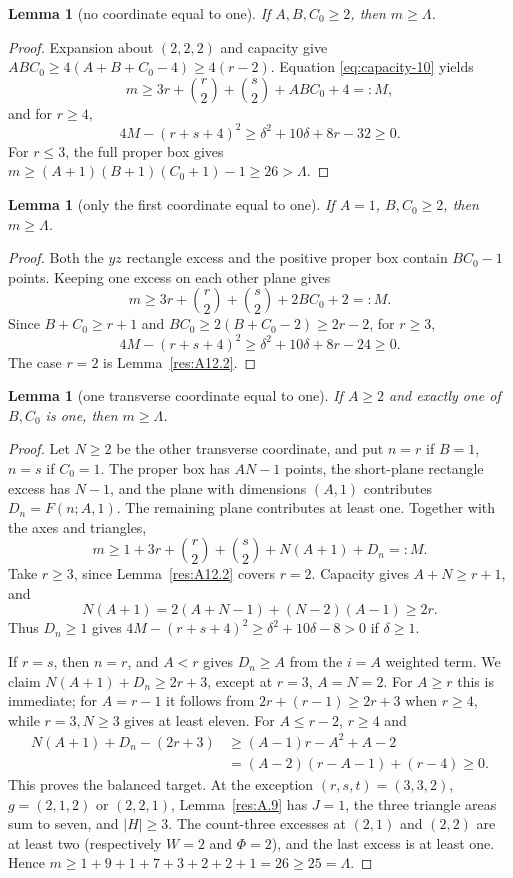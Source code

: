 \documentclass[11pt]{article}
\newtheorem{lemma}[theorem]{Lemma}
\theoremstyle{definition}
\theoremstyle{remark}
\theoremstyle{plain}
\begin{document}
\begin{lemma}[no coordinate equal to one]\label{res:A12.3}
If $A,B,C_0\ge2$, then $m\ge \Lambda$.
\end{lemma}
\begin{proof}
Expansion about $(2,2,2)$ and capacity give
$ABC_0\ge4(A+B+C_0-4)\ge4(r-2)$.
Equation \eqref{eq:capacity-10} yields
\[
 m\ge3r+\binom r2+\binom s2+ABC_0+4=:M,
\]
and for $r\ge4$,
\[
 4M-(r+s+4)^2\ge\delta^2+10\delta+8r-32\ge0.
\]
For $r\le3$, the full proper box gives
$m\ge(A+1)(B+1)(C_0+1)-1\ge26>\Lambda$.
\end{proof}

\begin{lemma}[only the first coordinate equal to one]\label{res:A12.4}
If $A=1$, $B,C_0\ge2$, then $m\ge \Lambda$.
\end{lemma}
\begin{proof}
Both the $yz$ rectangle excess and the positive proper box contain
$BC_0-1$ points.  Keeping one excess on each other plane gives
\[
 m\ge3r+\binom r2+\binom s2+2BC_0+2=:M.
\]
Since $B+C_0\ge r+1$ and
$BC_0\ge2(B+C_0-2)\ge2r-2$, for $r\ge3$,
\[
 4M-(r+s+4)^2\ge\delta^2+10\delta+8r-24\ge0.
\]
The case $r=2$ is Lemma~\ref{res:A12.2}. \end{proof}

\begin{lemma}[one transverse coordinate equal to one]\label{res:A12.5}
If $A\ge2$ and exactly one of $B,C_0$ is one, then $m\ge \Lambda$.
\end{lemma}
\begin{proof}
Let $N\ge2$ be the other transverse coordinate, and put $n=r$ if
$B=1$, $n=s$ if $C_0=1$.  The proper box has $AN-1$ points,
the short-plane rectangle excess has $N-1$, and the plane with
dimensions $(A,1)$ contributes $D_n=F(n;A,1)$.  The remaining plane
contributes at least one.  Together with the axes and triangles,
\[
 m\ge1+3r+\binom r2+\binom s2+N(A+1)+D_n=:M.\tag{3.11}\label{eq:capacity-11}
\]
Take $r\ge3$, since Lemma~\ref{res:A12.2} covers $r=2$.
Capacity gives $A+N\ge r+1$, and
\[
 N(A+1)=2(A+N-1)+(N-2)(A-1)\ge2r.
\]
Thus $D_n\ge1$ gives
$4M-(r+s+4)^2\ge\delta^2+10\delta-8>0$ if $\delta\ge1$.

If $r=s$, then $n=r$, and $A<r$ gives $D_n\ge A$ from the $i=A$
weighted term.  We claim $N(A+1)+D_n\ge2r+3$, except at $r=3$,
$A=N=2$.  For $A\ge r$ this is immediate; for $A=r-1$ it follows
from $2r+(r-1)\ge2r+3$ when $r\ge4$, while $r=3,N\ge3$ gives
at least eleven.  For $A\le r-2$, $r\ge4$ and
\[
\begin{split}
 N(A+1)+D_n-(2r+3)
 &\ge(A-1)r-A^2+A-2\\
 &=(A-2)(r-A-1)+(r-4)\ge0.
\end{split}
\]
This proves the balanced target.  At the exception
$(r,s,t)=(3,3,2)$, $g=(2,1,2)$ or $(2,2,1)$, Lemma~\ref{res:A.9} has $J=1$,
the three triangle areas sum to seven, and $|H|\ge3$.
The count-three excesses at $(2,1)$ and $(2,2)$ are at least two
(respectively $W=2$ and $\Phi=2$), and the last excess is at least one.
Hence $m\ge1+9+1+7+3+2+2+1=26\ge25=\Lambda$.
\end{proof}
\end{document}
